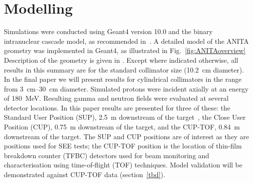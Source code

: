 \documentclass[11pt,a4paper]{IEEEtran}
\begin{document}
\section{Modelling}
Simulations were conducted using Geant4 version 10.0 and the binary intranuclear cascade model, as recommended in~\cite{Platt2013}.
A detailed model of the ANITA geometry was implemented in Geant4, as illustrated in Fig.~\ref{fig:ANITAoverview}
Description of the geometry is given in \cite{Prokofiev2009,Prokofiev2014}.
Except where indicated otherwise, all results in this summary are for the standard collimator size (\SI{10.2}{\cm} diameter).
In the final paper we will present results for cylindrical collimators in the range from \SIrange{3}{30}{\cm} diameter.
Simulated protons were incident axially at an energy of \SI{180}{\MeV}.
Resulting gamma and neutron fields were evaluated at several detector locations.
In this paper results are presented for three of these: the Standard User Position (SUP), \SI{2.5}{\m} downstream of the target~\cite{Prokofiev2009}, the Close User Position (CUP), \SI{0.75}{\m} downstream of the target, and the CUP-TOF, \SI{0.84}{m} downstream of the target.
The SUP and CUP positions are of interest as they are positions used for SEE tests; the CUP-TOF position is the location of thin-film breakdown counter (TFBC) detectors used for beam monitoring and characterisation using time-of-flight (TOF) techniques.
Model validation will be demonstrated against CUP-TOF data (section~\ref{tbd}).
\end{document}
